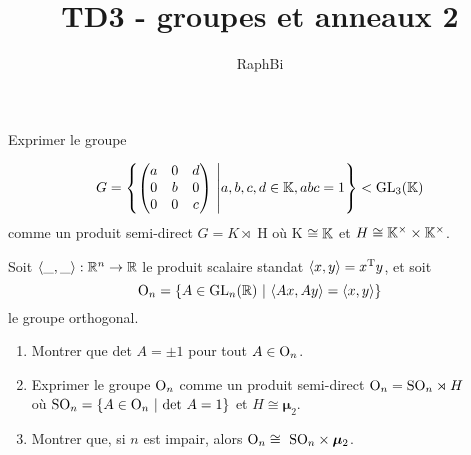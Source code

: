 \documentclass[french,a4paper,10pt]{article}
\title{\color{astral} \sffamily \bfseries TD3 - groupes et anneaux 2}
\author{RaphBi}
\begin{document}
    \maketitle
    \begin{td-exo}[1]
        Exprimer le groupe

        $$G = \left\{\begin{pmatrix}
            a & 0 & d\\
            0 & b & 0\\
            0 & 0 & c \end{pmatrix}\ 
            \middle| a,b,c,d \in \bb K, abc=1\right\} < \textmd{GL}_3(\bb K)$$
        comme un produit semi-direct $G = K \rtimes$ H où K $\cong \mathbb{K}$ et $H \cong \mathbb{K}^\times \times \mathbb{K}^\times$.
    \end{td-exo}

    \begin{td-exo}[2]
        Soit $\langle \_,\_\rangle: \mathbb{R}^n \rightarrow \mathbb{R}$ le produit scalaire standat $\langle x,y\rangle = x^\textmd{T}y$, et soit
        $$\textmd{O}_n = \left\{ A\in \textmd{GL}_n(\mathbb{R})\ | \ \langle Ax,Ay\rangle = \langle x,y \rangle \right\}$$ le groupe orthogonal.
        \begin{enumerate}[($i$)]
            \item Montrer que det $A = \pm 1$ pour tout $A\in \textmd{O}_n$.
            \item Exprimer le groupe $\textmd{O}_n$ comme un produit semi-direct $\textmd{O}_n = \textmd{SO}_n \rtimes H$\\
            où $\textmd{SO}_n = \{A\in \textmd{O}_n \ | \ \textmd{det} \ A = 1\}$ et $H \cong \bm{\mu}_2$.
            \item Montrer que, si $n$ est impair, alors $\textmd{O}_n \cong \ \textmd{SO}_n \times \bm{\mu}_2$.
        \end{enumerate}
    \end{td-exo}
\end{document}
